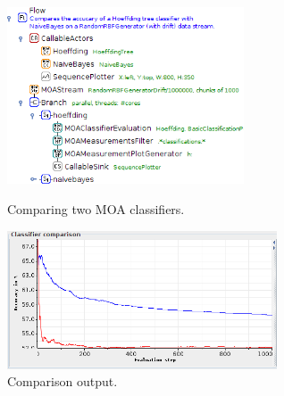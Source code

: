 \documentclass[wcp]{jmlr}
\begin{document}
\begin{figure}[htb]
  \begin{minipage}[b]{0.5\linewidth}
  \centering
  \includegraphics[width=7.0cm]{images/example_flow_clipped.png}
  \caption{Comparing two MOA classifiers.}
  \label{example_flow}
  \end{minipage}%
  \begin{minipage}[b]{0.5\linewidth}
  \centering
  \includegraphics[width=8.0cm]{images/example_output_clipped.png}
  \caption{Comparison output.}
  \label{example_output}
  \end{minipage}
\end{figure}
\end{document}
